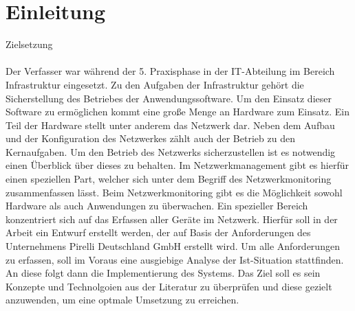\chapter{Einleitung}
\label{cha:Einleitung}

Zielsetzung\\
\\
Der Verfasser war während der 5. Praxisphase in der IT-Abteilung im Bereich Infrastruktur eingesetzt.
Zu den Aufgaben der Infrastruktur gehört die Sicherstellung des Betriebes der Anwendungssoftware.
Um den Einsatz dieser Software zu ermöglichen kommt eine große Menge an Hardware zum Einsatz.
Ein Teil der Hardware stellt unter anderem das Netzwerk dar.
Neben dem Aufbau und der Konfiguration des Netzwerkes zählt auch der Betrieb zu den Kernaufgaben.
Um den Betrieb des Netzwerks sicherzustellen ist es notwendig einen Überblick über dieses zu behalten.
Im Netzwerkmanagement gibt es hierfür einen speziellen Part, welcher sich unter dem Begriff des Netzwerkmonitoring zusammenfassen lässt.
Beim Netzwerkmonitoring gibt es die Möglichkeit sowohl Hardware als auch Anwendungen zu überwachen.
Ein spezieller Bereich konzentriert sich auf das Erfassen aller Geräte im Netzwerk.
Hierfür soll in der Arbeit ein Entwurf erstellt werden, der auf Basis der Anforderungen des Unternehmens Pirelli Deutschland GmbH erstellt wird.
Um alle Anforderungen zu erfassen, soll im Voraus eine ausgiebige Analyse der Ist-Situation stattfinden.
An diese folgt dann die Implementierung des Systems.
Das Ziel soll es sein Konzepte und Technolgoien aus der Literatur zu überprüfen und diese gezielt anzuwenden, um eine optmale Umsetzung zu erreichen. 

